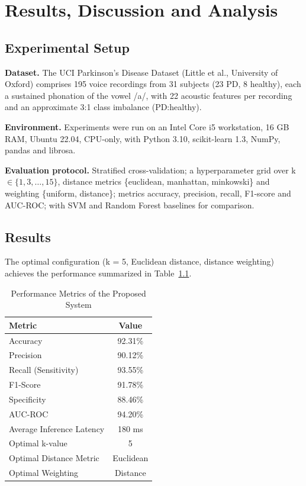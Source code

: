 \documentclass[oneside,a4paper,12pt]{report}
\begin{document}
\chapter{Results, Discussion and Analysis}

\section{Experimental Setup}
\textbf{Dataset.} The UCI Parkinson's Disease Dataset (Little et al., University
of Oxford) comprises 195 voice recordings from 31 subjects (23 PD, 8 healthy),
each a sustained phonation of the vowel /a/, with 22 acoustic features per
recording and an approximate 3:1 class imbalance (PD:healthy).

\textbf{Environment.} Experiments were run on an Intel Core i5 workstation, 16 GB
RAM, Ubuntu 22.04, CPU-only, with Python 3.10, scikit-learn 1.3, NumPy, pandas
and librosa.

\textbf{Evaluation protocol.} Stratified cross-validation; a hyperparameter grid
over k $\in \{1,3,\dots,15\}$, distance metrics \{euclidean, manhattan,
minkowski\} and weighting \{uniform, distance\}; metrics accuracy, precision,
recall, F1-score and AUC-ROC; with SVM and Random Forest baselines for
comparison.

\section{Results}
The optimal configuration (k = 5, Euclidean distance, distance weighting)
achieves the performance summarized in Table~\ref{tab:metrics}.

\begin{table}[H]
\centering
\caption{Performance Metrics of the Proposed System}
\label{tab:metrics}
\def\arraystretch{1.25}
\begin{tabular}{|l|c|}
\hline
\textbf{Metric} & \textbf{Value} \\ \hline
Accuracy & 92.31\% \\ \hline
Precision & 90.12\% \\ \hline
Recall (Sensitivity) & 93.55\% \\ \hline
F1-Score & 91.78\% \\ \hline
Specificity & 88.46\% \\ \hline
AUC-ROC & 94.20\% \\ \hline
Average Inference Latency & 180 ms \\ \hline
Optimal k-value & 5 \\ \hline
Optimal Distance Metric & Euclidean \\ \hline
Optimal Weighting & Distance \\ \hline
\end{tabular}
\end{table}
\end{document}
